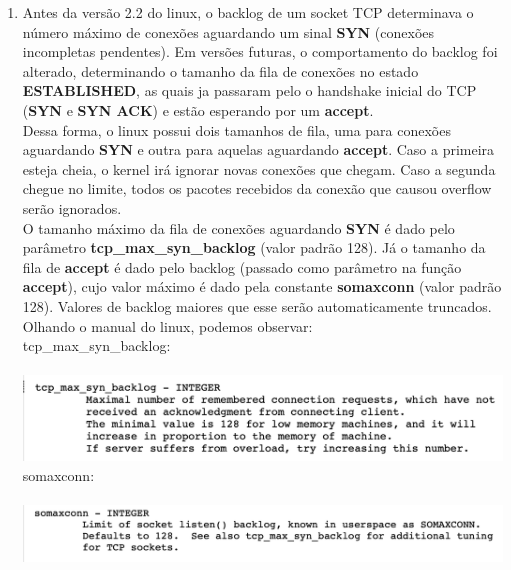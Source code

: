 \documentclass[12pt,a4paper]{report}
\begin{document}
\begin{enumerate}
    \item Antes da versão 2.2 do linux, o backlog de um socket TCP determinava o número máximo de conexões aguardando um sinal \textbf{SYN} (conexões incompletas pendentes). Em versões futuras, o comportamento do backlog foi alterado, determinando o tamanho da fila de conexões no estado \textbf{ESTABLISHED}, as quais ja passaram pelo o handshake inicial do TCP (\textbf{SYN} e \textbf{SYN ACK}) e estão esperando por um \textbf{accept}.
    \\
    Dessa forma, o linux possui dois tamanhos de fila, uma para conexões aguardando \textbf{SYN} e outra para aquelas aguardando \textbf{accept}. Caso a primeira esteja cheia, o kernel irá ignorar novas conexões que chegam. Caso a segunda chegue no limite, todos os pacotes recebidos da conexão que causou overflow serão ignorados.
    \\ 
    O tamanho máximo da fila de conexões aguardando \textbf{SYN} é dado pelo parâmetro \textbf{tcp\_max\_syn\_backlog} (valor padrão 128). Já o tamanho da fila de \textbf{accept} é dado pelo backlog (passado como parâmetro na função \textbf{accept}), cujo valor máximo é dado pela constante \textbf{somaxconn} (valor padrão 128). Valores de backlog maiores que esse serão automaticamente truncados.
    \\
    Olhando o manual do linux, podemos observar:\\
    tcp\_max\_syn\_backlog:\\\\
    \includegraphics[width=1\textwidth]{images/tcp_max_syn_backlog.png}\\
    somaxconn:\\\\
    \includegraphics[width=1\textwidth]{images/somaxconn.png}
    

\end{enumerate}
\end{document}
